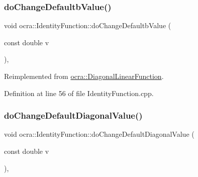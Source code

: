 \hypertarget{classocra_1_1IdentityFunction_a989f91f6ec4e2e00aa5ac3cc8b6a2b66}{}\label{classocra_1_1IdentityFunction_a989f91f6ec4e2e00aa5ac3cc8b6a2b66} 
\subsubsection{\texorpdfstring{do\+Change\+Defaultb\+Value()}{doChangeDefaultbValue()}}
{\footnotesize\ttfamily void ocra\+::\+Identity\+Function\+::do\+Change\+Defaultb\+Value (\begin{DoxyParamCaption}\item[{const double}]{v }\end{DoxyParamCaption})\hspace{0.3cm}{\ttfamily [protected]}, {\ttfamily [virtual]}}



Reimplemented from \hyperlink{classocra_1_1DiagonalLinearFunction_a9995af94055dc443c10018869a393635}{ocra\+::\+Diagonal\+Linear\+Function}.



Definition at line 56 of file Identity\+Function.\+cpp.

\hypertarget{classocra_1_1IdentityFunction_ad54cf6c0b28f6d4955f15ebd53c6ca1f}{}\label{classocra_1_1IdentityFunction_ad54cf6c0b28f6d4955f15ebd53c6ca1f} 
\subsubsection{\texorpdfstring{do\+Change\+Default\+Diagonal\+Value()}{doChangeDefaultDiagonalValue()}}
{\footnotesize\ttfamily void ocra\+::\+Identity\+Function\+::do\+Change\+Default\+Diagonal\+Value (\begin{DoxyParamCaption}\item[{const double}]{v }\end{DoxyParamCaption})\hspace{0.3cm}{\ttfamily [protected]}, {\ttfamily [virtual]}}



